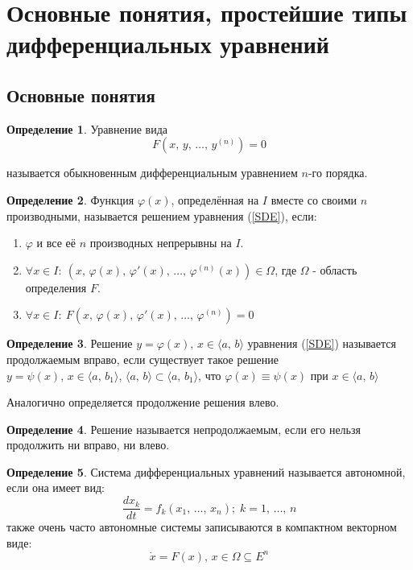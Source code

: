 \documentclass[a4paper,12pt]{article}
\renewcommand{\phi}{\ensuremath{\varphi}}
\theoremstyle{plain}
\theoremstyle{definition}
\newtheorem{definition}{Определение}[section]
\theoremstyle{remark}
\begin{document}
\tableofcontents
\newpage

\section{Основные понятия, простейшие типы дифференциальных уравнений}
\subsection{Основные понятия}
\begin{definition}
	Уравнение вида
	\begin{equation}
		\label{SDE}
		F(x,\, y,\, \ldots,\, y^{(n)}) = 0
	\end{equation}

	называется обыкновенным дифференциальным уравнением $n$-го порядка.
\end{definition}

\begin{definition}
	Функция $\phi(x)$, определённая на $I$ вместе со своими $n$ производными, называется решением уравнения (\ref*{SDE}), если:

	\begin{enumerate}
		\item $\phi$ и все её $n$ производных непрерывны на $I$.
		\item $\forall x \in I:\: (x,\, \phi(x),\, \phi'(x),\, \ldots,\, \phi^{(n)}(x)) \in \Omega$, где $\Omega$ - область определения $F$.
		\item $\forall x \in I:\: F(x,\, \phi(x),\, \phi'(x),\,\ldots,\,\phi^{(n)}) = 0$
	\end{enumerate}
\end{definition}

\begin{definition}
	Решение $y = \phi(x),\, x \in \langle a,\, b\rangle$ уравнения (\ref*{SDE}) называется продолжаемым вправо, если существует такое решение $y = \psi(x),\, x \in \langle a,\, b_1 \rangle,\, \langle a,\, b\rangle \subset \langle a,\, b_1 \rangle$, что $\phi(x) \equiv \psi(x)$ при $x \in \langle a,\, b\rangle$

	Аналогично определяется продолжение решения влево.
\end{definition}

\begin{definition}
	Решение называется непродолжаемым, если его нельзя продолжить ни вправо, ни влево.
\end{definition}

\begin{definition}
	Система дифференциальных уравнений называется автономной, если она имеет вид:
	\[
		\frac{dx_k}{dt} = f_k(x_1,\, \ldots,\,x_n);\; k = 1,\,\ldots,\,n
	\]
	также очень часто автономные системы записываются в компактном векторном виде:
	\begin{equation}
		\label{Autonomius}
		\dot{x} = F(x),\, x \in \Omega \subseteq E^n
	\end{equation}

\end{definition}
\end{document}
